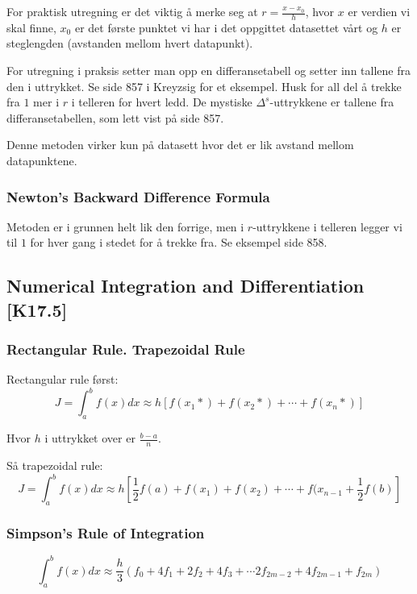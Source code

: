 \documentclass[norsk, a4paper, 12pt, titlepage]{article}
\begin{document}
For praktisk utregning er det viktig å merke seg at $r = \frac{x -
x_{0}}{h}$, hvor $x$ er verdien vi skal finne, $x_{0}$ er det første
punktet vi har i det oppgittet datasettet vårt og $h$ er steglengden
(avstanden mellom hvert datapunkt).

For utregning i praksis setter man opp en differansetabell og setter
inn tallene fra den i uttrykket.  Se side 857 i Kreyzsig for et
eksempel.  Husk for all del å trekke fra $1$ mer i $r$ i telleren for
hvert ledd.  De mystiske $\Delta^{s}$-uttrykkene er tallene fra
differansetabellen, som lett vist på side 857.

Denne metoden virker kun på datasett hvor det er lik avstand mellom
datapunktene.

\subsubsection{Newton's Backward Difference Formula}
Metoden er i grunnen helt lik den forrige, men i $r$-uttrykkene i
telleren legger vi til $1$ for hver gang i stedet for å trekke fra.
Se eksempel side 858.

\subsection{Numerical Integration and Differentiation [K17.5]}

\subsubsection{Rectangular Rule. Trapezoidal Rule}

Rectangular rule først:
\begin{equation}
J = \int_{a}^{b}f(x)dx \approx h[f(x_{1}*) + f(x_{2}*) + \cdots +
f(x_{n}*)]
\end{equation}

Hvor $h$ i uttrykket over er $\frac{b - a}{n}$.


Så trapezoidal rule:
\begin{equation}
J = \int_{a}^{b}f(x)dx \approx h[\frac{1}{2}f(a) + f(x_{1}) + f(x_{2})
+ \cdots + f(x_{n-1} + \frac{1}{2}f(b)]
\end{equation}

\subsubsection{Simpson's Rule of Integration}

\begin{equation}
\int_{a}^{b}f(x)dx \approx \frac{h}{3}(f_{0} + 4f_{1} + 2f_{2} +
4f_{3} + \cdots 2f_{2m-2} + 4f_{2m-1} + f_{2m})
\end{equation}
\end{document}
